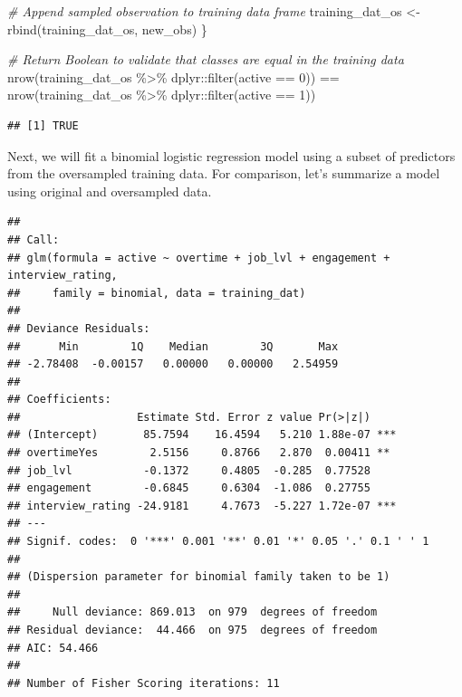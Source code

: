 \documentclass[
]{book}
\newenvironment{Shaded}{\begin{snugshade}}{\end{snugshade}}
\newcommand{\CommentTok}[1]{\textcolor[rgb]{0.56,0.35,0.01}{\textit{#1}}}
\newcommand{\DecValTok}[1]{\textcolor[rgb]{0.00,0.00,0.81}{#1}}
\newcommand{\FunctionTok}[1]{\textcolor[rgb]{0.00,0.00,0.00}{#1}}
\newcommand{\NormalTok}[1]{#1}
\newcommand{\OtherTok}[1]{\textcolor[rgb]{0.56,0.35,0.01}{#1}}
\newcommand{\SpecialCharTok}[1]{\textcolor[rgb]{0.00,0.00,0.00}{#1}}
\begin{document}
\begin{Shaded}
\begin{Highlighting}[]
  \CommentTok{\# Append sampled observation to training data frame}
\NormalTok{  training\_dat\_os }\OtherTok{\textless{}{-}} \FunctionTok{rbind}\NormalTok{(training\_dat\_os, new\_obs)}
\NormalTok{\}}

\CommentTok{\# Return Boolean to validate that classes are equal in the training data}
\FunctionTok{nrow}\NormalTok{(training\_dat\_os }\SpecialCharTok{\%\textgreater{}\%}\NormalTok{ dplyr}\SpecialCharTok{::}\FunctionTok{filter}\NormalTok{(active }\SpecialCharTok{==} \DecValTok{0}\NormalTok{)) }\SpecialCharTok{==} \FunctionTok{nrow}\NormalTok{(training\_dat\_os }\SpecialCharTok{\%\textgreater{}\%}\NormalTok{ dplyr}\SpecialCharTok{::}\FunctionTok{filter}\NormalTok{(active }\SpecialCharTok{==} \DecValTok{1}\NormalTok{))}
\end{Highlighting}
\end{Shaded}

\begin{verbatim}
## [1] TRUE
\end{verbatim}

Next, we will fit a binomial logistic regression model using a subset of predictors from the oversampled training data. For comparison, let's summarize a model using original and oversampled data.

\begin{verbatim}
## 
## Call:
## glm(formula = active ~ overtime + job_lvl + engagement + interview_rating, 
##     family = binomial, data = training_dat)
## 
## Deviance Residuals: 
##      Min        1Q    Median        3Q       Max  
## -2.78408  -0.00157   0.00000   0.00000   2.54959  
## 
## Coefficients:
##                  Estimate Std. Error z value Pr(>|z|)    
## (Intercept)       85.7594    16.4594   5.210 1.88e-07 ***
## overtimeYes        2.5156     0.8766   2.870  0.00411 ** 
## job_lvl           -0.1372     0.4805  -0.285  0.77528    
## engagement        -0.6845     0.6304  -1.086  0.27755    
## interview_rating -24.9181     4.7673  -5.227 1.72e-07 ***
## ---
## Signif. codes:  0 '***' 0.001 '**' 0.01 '*' 0.05 '.' 0.1 ' ' 1
## 
## (Dispersion parameter for binomial family taken to be 1)
## 
##     Null deviance: 869.013  on 979  degrees of freedom
## Residual deviance:  44.466  on 975  degrees of freedom
## AIC: 54.466
## 
## Number of Fisher Scoring iterations: 11
\end{verbatim}
\end{document}
